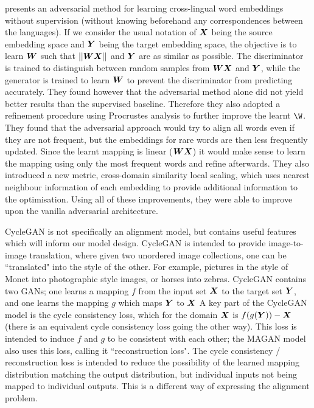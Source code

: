\cite{wordtranslationwithoutparalleldata} presents an adversarial method for learning cross-lingual word embeddings without supervision (without knowing beforehand any correspondences between the languages). If we consider the usual notation of $\boldsymbol{X}$ being the source embedding space and $\boldsymbol{Y}$ being the target embedding space, the objective is to learn $\boldsymbol{W}$ such that $||\boldsymbol{W} \boldsymbol{X}||$ and $\boldsymbol{Y}$ are as similar as possible. The discriminator is trained to distinguish between random samples from $\boldsymbol{W} \boldsymbol{X}$ and $\boldsymbol{Y}$, while the generator is trained to learn $\boldsymbol{W}$ to prevent the discriminator from predicting accurately. They found however that the adversarial method alone did not yield better results than the supervised baseline. Therefore they also adopted a refinement procedure using Procrustes analysis to further improve the learnt $\W$. They found that the adversarial approach would try to align all words even if they are not frequent, but the embeddings for rare words are then less frequently updated. Since the learnt mapping is linear ($\boldsymbol{W} \boldsymbol{X}$) it would make sense to learn the mapping using only the most frequent words and refine afterwards. They also introduced a new metric, cross-domain similarity local scaling, which uses nearest neighbour information of each embedding to provide additional information to the optimisation. Using all of these improvements, they were able to improve upon the vanilla adversarial architecture. 

CycleGAN \cite{CycleGAN} is not specifically an alignment model, but contains useful features which will inform our model design. CycleGAN is intended to provide image-to-image translation, where given two unordered image collections, one can be ``translated" into the style of the other. For example, pictures in the style of Monet into photographic style images, or horses into zebras. CycleGAN contains two GANs; one learns a mapping $f$ from the input set $\boldsymbol{X}$ to the target set $\boldsymbol{Y}$, and one learns the mapping $g$ which maps $\boldsymbol{Y}$ to $\boldsymbol{X}$ A key part of the CycleGAN model is the cycle consistency loss, which for the domain $\boldsymbol{X}$ is $f(g(\boldsymbol{Y})) - \boldsymbol{X}$ (there is an equivalent cycle consistency loss going the other way). This loss is intended to induce $f$ and $g$ to be consistent with each other; the MAGAN model also uses this loss, calling it ``reconstruction loss". The cycle consistency / reconstruction loss is intended to reduce the possibility of the learned mapping distribution matching the output distribution, but individual inputs not being mapped to individual outputs. This is a different way of expressing the alignment problem. 

